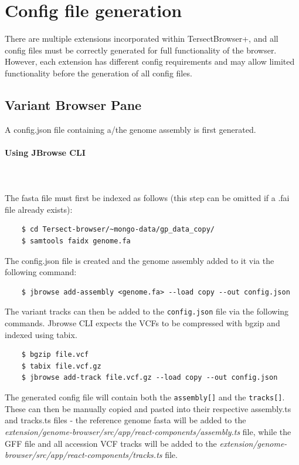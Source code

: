\documentclass[12pt]{article}
\begin{document}
\section{Config file generation}
There are multiple extensions incorporated within TersectBrowser+, and all config files must be correctly generated for full functionality of the browser. However, each extension has different config requirements and may allow limited functionality before the generation of all config files.

\subsection{Variant Browser Pane}
A config.json file containing a/the genome assembly is first generated. 
\paragraph{Using JBrowse CLI}\mbox{}
\\\\
The fasta file must first be indexed as follows (this step can be omitted if a .fai file already exists):
\lstset{
  language=bash,
  basicstyle=\ttfamily
}
\begin{lstlisting}
    $ cd Tersect-browser/~mongo-data/gp_data_copy/
    $ samtools faidx genome.fa 
\end{lstlisting}
The config.json file is created and the genome assembly added to it via the following command:
\begin{lstlisting}
    $ jbrowse add-assembly <genome.fa> --load copy --out config.json
\end{lstlisting}
The variant tracks can then be added to the \verb+config.json+ file via the following commands. Jbrowse CLI expects the VCFs to be compressed with bgzip and indexed using tabix. 
\begin{lstlisting}
    $ bgzip file.vcf 
    $ tabix file.vcf.gz 
    $ jbrowse add-track file.vcf.gz --load copy --out config.json 
\end{lstlisting}
The generated config file will contain both the \verb+assembly[]+ and the \verb+tracks[]+. These can then be manually copied and pasted into their respective assembly.ts and tracks.ts files - the reference genome fasta will be added to the \textit{extension/genome-browser/src/app/react-components/assembly.ts} file, while the GFF file and all accession VCF tracks will be added to the \textit{extension/genome-browser/src/app/react-components/tracks.ts} file.
\end{document}
